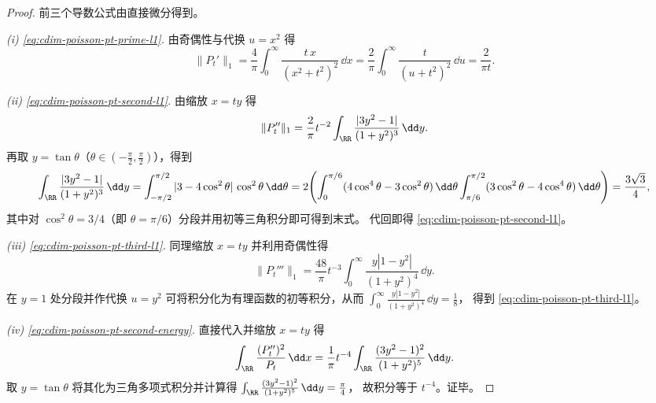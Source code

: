 \begin{proof}
前三个导数公式由直接微分得到。
\par
\emph{(i) \eqref{eq:cdim-poisson-pt-prime-l1}.}
由奇偶性与代换 \(u=x^2\) 得
\[
\|P_t'\|_{1}
=\frac{4}{\pi}\int_0^\infty \frac{t\,x}{(x^2+t^2)^2}\,\dd x
=\frac{2}{\pi}\int_0^\infty \frac{t}{(u+t^2)^2}\,\dd u
=\frac{2}{\pi t}.
\]
\par
\emph{(ii) \eqref{eq:cdim-poisson-pt-second-l1}.}
由缩放 \(x=ty\) 得
\[
\|P_t''\|_{1}
=\frac{2}{\pi}t^{-2}\int_{\RR}\frac{|3y^2-1|}{(1+y^2)^3}\,\dd y.
\]
再取 \(y=\tan\theta\)（\(\theta\in(-\tfrac\pi2,\tfrac\pi2)\)），得到
\[
\int_{\RR}\frac{|3y^2-1|}{(1+y^2)^3}\,\dd y
=\int_{-\pi/2}^{\pi/2}|3-4\cos^2\theta|\,\cos^2\theta\,\dd\theta
=2\!\left(\int_0^{\pi/6}(4\cos^4\theta-3\cos^2\theta)\,\dd\theta
\int_{\pi/6}^{\pi/2}(3\cos^2\theta-4\cos^4\theta)\,\dd\theta\right)
=\frac{3\sqrt3}{4},
\]
其中对 \(\cos^2\theta=3/4\)（即 \(\theta=\pi/6\)）分段并用初等三角积分即可得到末式。
代回即得 \eqref{eq:cdim-poisson-pt-second-l1}。
\par
\emph{(iii) \eqref{eq:cdim-poisson-pt-third-l1}.}
同理缩放 \(x=ty\) 并利用奇偶性得
\[
\|P_t'''\|_{1}
=\frac{48}{\pi}t^{-3}\int_{0}^{\infty}\frac{y|1-y^{2}|}{(1+y^2)^4}\,\dd y.
\]
在 \(y=1\) 处分段并作代换 \(u=y^2\) 可将积分化为有理函数的初等积分，从而
\(
\int_{0}^{\infty}\frac{y|1-y^{2}|}{(1+y^2)^4}\,\dd y=\frac18
\)，
得到 \eqref{eq:cdim-poisson-pt-third-l1}。
\par
\emph{(iv) \eqref{eq:cdim-poisson-pt-second-energy}.}
直接代入并缩放 \(x=ty\) 得
\[
\int_{\RR}\frac{(P_t'')^{2}}{P_t}\,\dd x
=\frac{1}{\pi}t^{-4}\int_{\RR}\frac{(3y^2-1)^2}{(1+y^2)^5}\,\dd y.
\]
取 \(y=\tan\theta\) 将其化为三角多项式积分并计算得
\(
\int_{\RR}\frac{(3y^2-1)^2}{(1+y^2)^5}\,\dd y=\frac{\pi}{4}
\)，
故积分等于 \(t^{-4}\)。证毕。
\end{proof}

